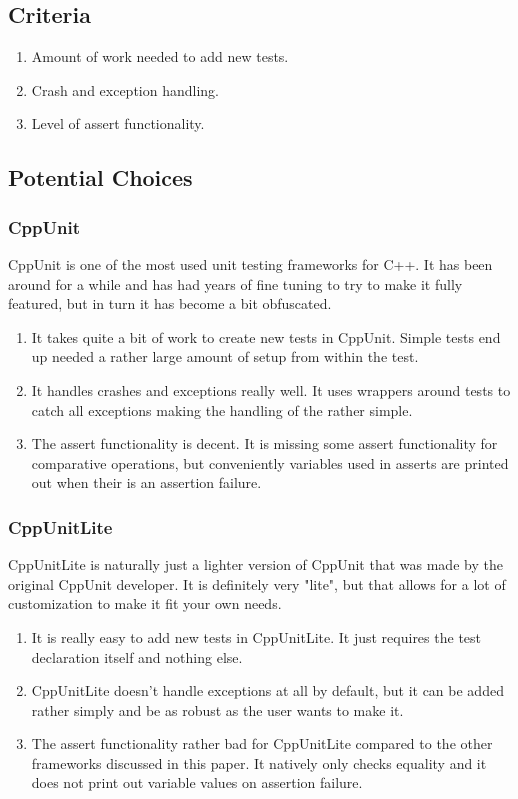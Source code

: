 \documentclass[onecolumn, draftclsnofoot,10pt, compsoc]{IEEEtran}
\begin{document}
\subsection{Criteria}
\begin{enumerate}
\item Amount of work needed to add new tests.
\item Crash and exception handling.
\item Level of assert functionality.
\end{enumerate}
\subsection{Potential Choices}

\subsubsection{CppUnit}
CppUnit is one of the most used unit testing frameworks for C++. It has been around for a while and has had years of fine tuning to try to make it fully featured, but in turn it has become a bit obfuscated.
\begin{enumerate}
\item It takes quite a bit of work to create new tests in CppUnit. Simple tests end up needed a rather large amount of setup from within the test.
\item It handles crashes and exceptions really well. It uses wrappers around tests to catch all exceptions making the handling of the rather simple.
\item The assert functionality is decent. It is missing some assert functionality for comparative operations, but conveniently variables used in asserts are printed out when their is an assertion failure.
\end{enumerate}

\subsubsection{CppUnitLite}
CppUnitLite is naturally just a lighter version of CppUnit that was made by the original CppUnit developer. It is definitely very "lite", but that allows for a lot of customization to make it fit your own needs.  
\begin{enumerate}
\item It is really easy to add new tests in CppUnitLite. It just requires the test declaration itself and nothing else.
\item CppUnitLite doesn't handle exceptions at all by default, but it can be added rather simply and be as robust as the user wants to make it.
\item The assert functionality rather bad for CppUnitLite compared to the other frameworks discussed in this paper. It natively only checks equality and it does not print out variable values on assertion failure.
\end{enumerate}
\end{document}
